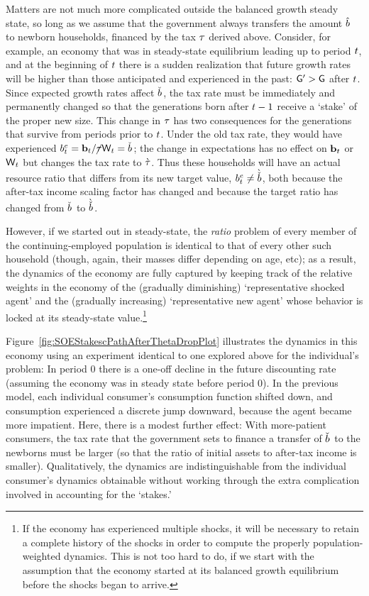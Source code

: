 \documentclass{handout}
\begin{document}
Matters are not much more complicated outside the balanced growth
steady state, so long as we assume that the government always
transfers the amount $\hat{b}^{\null}$ to newborn households, financed by
the tax $\tau$ derived above.  Consider, for example, an economy that
was in steady-state equilibrium leading up to period $t$, and at
the beginning of $t$ there is a sudden realization that future
growth rates will be higher than those anticipated and experienced in
the past: $\mathsf{G}^{\prime} > \mathsf{G}$ after $t$.  Since expected
growth rates affect $\bTarg^{\null}$, the tax rate must be immediately and
permanently changed so that the generations born after $t-1$
receive a `stake' of the proper new size.  This change in $\tau$ has
two consequences for the generations that survive from periods prior
to $t$.  Under the old tax rate, they would have experienced
$\bE_{t} = \bLevBF_{t}/\TaxFree\Wage_{t} = \bTarg^{\null}$; the change in
expectations has no effect on $\mathbf{b}_{t}$ or $\mathsf{W}_{t}$ but changes
the tax rate to $\grave{\tau}$.  Thus these households will have an
actual resource ratio that differs from its new target value, $\bE_{t}
\neq \Alt{\bTarg}^{\null}$, both because the after-tax income scaling factor
has changed and because the target ratio has changed from $\bTarg^{\null}$
to $\Alt{\bTarg}^{\null}$.

However, if we started out in steady-state, the {\it ratio} problem of every
member of the continuing-employed population is identical to that of every 
other such household (though, again, their masses differ depending on age, etc); as a result, the dynamics of the economy are fully captured
by keeping track of the relative weights in the economy of the (gradually diminishing) `representative shocked agent' and the (gradually increasing) `representative new agent' 
whose behavior is locked at its steady-state value.\footnote{
If the economy has experienced multiple shocks, it will be necessary to
retain a complete history of the shocks in order to compute the properly 
population-weighted dynamics.  This is not too hard to do, if we start with
the assumption that the economy started at its balanced growth equilibrium before the shocks began to arrive.}

Figure~\ref{fig:SOEStakescPathAfterThetaDropPlot} illustrates the
dynamics in this economy using an experiment identical to one explored
above for the individual's problem: In period 0 there is a one-off
decline in the future discounting rate (assuming the economy was in
steady state before period 0).  In the previous model, each individual
consumer's consumption function shifted down, and consumption
experienced a discrete jump downward, because the agent became more
impatient.  Here, there is a modest further effect: With
more-patient consumers, the tax rate that the government sets to finance a transfer
of $\bTarg^{\null}$ to the newborns must be larger (so that the ratio of initial assets to
after-tax income is smaller).  Qualitatively, the
dynamics are indistinguishable from the individual consumer's dynamics
obtainable without working through the extra complication involved in
accounting for the `stakes.'
\end{document}

